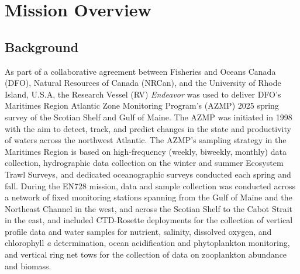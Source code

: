 \documentclass[12pt]{article}\usepackage[]{graphicx}\usepackage[]{color}
\begin{document}

\frontmatter


\renewcommand{\headrulewidth}{0.5pt}  %
\renewcommand{\footrulewidth}{0.5pt}  %

\newcommand{\lt}{\ensuremath <}
\newcommand{\gt}{\ensuremath >}

% 
\section{Mission Overview}\label{mission-overview}

\subsection{Background}\label{background}

As part of a collaborative agreement between Fisheries and Oceans Canada (DFO), Natural Resources of Canada (NRCan), and the University of Rhode Island, U.S.A, the Research Vessel (RV) \emph{Endeavor} was used to deliver DFO's Maritimes Region Atlantic Zone Monitoring Program's (AZMP) 2025 spring survey of the Scotian Shelf and Gulf of Maine. The AZMP was initiated in 1998 with the aim to detect, track, and predict changes in the state and productivity of waters across the northwest Atlantic. The AZMP's sampling strategy in the Maritimes Region is based on high-frequency (weekly, biweekly, monthly) data collection, hydrographic data collection on the winter and summer Ecosystem Trawl Surveys, and dedicated oceanographic surveys conducted each spring and fall. During the EN728 mission, data and sample collection was conducted across a network of fixed monitoring stations spanning from the Gulf of Maine and the Northeast Channel in the west, and across the Scotian Shelf to the Cabot Strait in the east, and included CTD-Rosette deployments for the collection of vertical profile data and water samples for nutrient, salinity, dissolved oxygen, and chlorophyll \emph{a} determination, ocean acidification and phytoplankton monitoring, and vertical ring net tows for the collection of data on zooplankton abundance and biomass.
\end{document}
